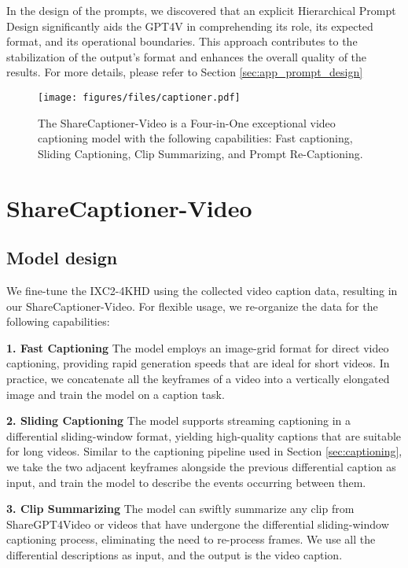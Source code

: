 In the design of the prompts, we discovered that an explicit Hierarchical Prompt Design significantly aids the GPT4V in comprehending its role, its expected format, and its operational boundaries. This approach contributes to the stabilization of the output’s format and enhances the overall quality of the results. For more details, please refer to Section \ref{sec:app_prompt_design}

\begin{figure*}[!t]
    \centering
    \texttt{[image: figures/files/captioner.pdf]}
    \caption{The ShareCaptioner-Video is a Four-in-One exceptional video captioning model with the following capabilities: Fast captioning, Sliding Captioning, Clip Summarizing, and Prompt Re-Captioning.}
    \label{fig:captioner}
\end{figure*}
\section{ShareCaptioner-Video}
\subsection{Model design}
We fine-tune the IXC2-4KHD \cite{dong2024internlm4k} using the collected video caption data, resulting in our ShareCaptioner-Video. For flexible usage, we re-organize the data for the following capabilities: 

\noindent\textbf{1. Fast Captioning} The model employs an image-grid format for direct video captioning, providing rapid generation speeds that are ideal for short videos. In practice, we concatenate all the keyframes of a video into a vertically elongated image and train the model on a caption task.

\noindent\textbf{2. Sliding Captioning} The model supports streaming captioning in a differential sliding-window format, yielding high-quality captions that are suitable for long videos. Similar to the captioning pipeline used in Section \ref{sec:captioning}, we take the two adjacent keyframes alongside the previous differential caption as input, and train the model to describe the events occurring between them.

\noindent\textbf{3. Clip Summarizing} The model can swiftly summarize any clip from ShareGPT4Video or videos that have undergone the differential sliding-window captioning process, eliminating the need to re-process frames. We use all the differential descriptions as input, and the output is the video caption.

